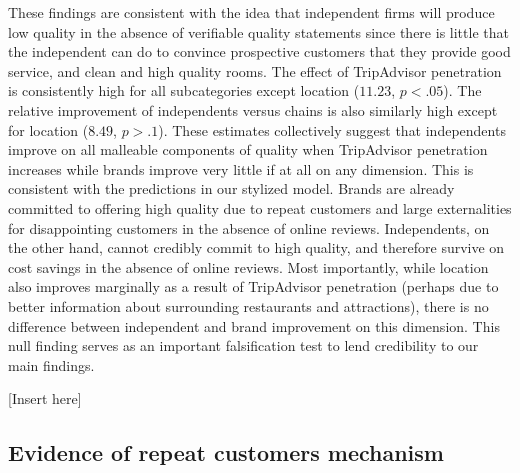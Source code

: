 \documentclass[mksc,blindrev]{informs3} %
\begin{document}
These findings are consistent with the idea that independent firms will produce low quality in the absence of verifiable quality statements since there is little that the independent can do to convince prospective customers that they provide good service, and clean and high quality rooms. The effect of TripAdvisor penetration is consistently high for all subcategories except location ($11.23$, $p<.05$). The relative improvement of independents versus chains is also similarly high except for location ($8.49$, $p>.1$). These estimates collectively suggest that independents improve on all malleable components of quality when TripAdvisor penetration increases while brands improve very little if at all on any dimension. This is consistent with the predictions in our stylized model. Brands are already committed to offering high quality due to repeat customers and large externalities for disappointing customers in the absence of online reviews. Independents, on the other hand, cannot credibly commit to high quality, and therefore survive on cost savings in the absence of online reviews. Most importantly, while location also improves marginally as a result of TripAdvisor penetration (perhaps due to better information about surrounding restaurants and attractions), there is no difference between independent and brand improvement on this dimension. This null finding serves as an important falsification test to lend credibility to our main findings.

[Insert  here]

\subsection{Evidence of repeat customers mechanism}
\end{document}
